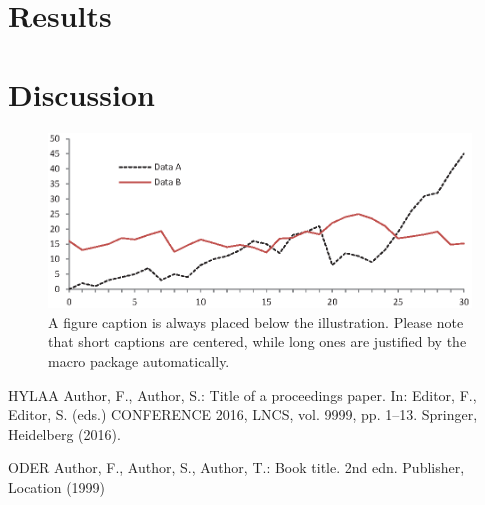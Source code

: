 \documentclass[runningheads]{llncs}
\begin{document}
\section{Results}

\section{Discussion}

\begin{figure}
\includegraphics[width=\textwidth]{fig1.eps}
\caption{A figure caption is always placed below the illustration.
Please note that short captions are centered, while long ones are
justified by the macro package automatically.} \label{fig1}
\end{figure}

%
%
%
% 
% 
%
\begin{thebibliography}{8}


HYLAA Author, F., Author, S.: Title of a proceedings paper. In: Editor,
F., Editor, S. (eds.) CONFERENCE 2016, LNCS, vol. 9999, pp. 1--13.
Springer, Heidelberg (2016). 

ODER Author, F., Author, S., Author, T.: Book title. 2nd edn. Publisher,
Location (1999)

\end{thebibliography}
\end{document}
